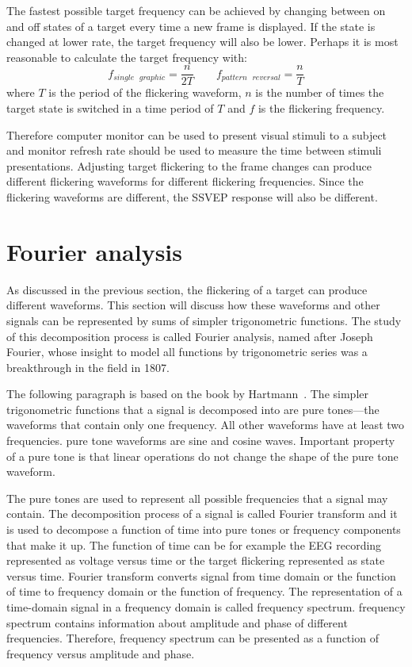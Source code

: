 The fastest possible target frequency can be achieved by changing between on and off \glspl{state} of a target every time a new \gls{frame} is displayed. If the \gls{state} is changed at lower rate, the \gls{target} frequency will also be lower. Perhaps it is most reasonable to calculate the \gls{target} frequency with:
\begin{equation}
	f_{single\mbox{ }graphic} = \frac{n}{2T} \qquad f_{pattern\mbox{ }reversal} = \frac{n}{T}
\end{equation}
where $T$ is the period of the \gls{flickering waveform}, $n$ is the number of times the \gls{target} \gls{state} is switched in a time period of $T$ and $f$ is the \gls{flickering} frequency.

Therefore computer monitor can be used to present visual stimuli to a subject and monitor \gls{refresh rate} should be used to measure the time between stimuli presentations. Adjusting \gls{target} \gls{flickering} to the \gls{frame} changes can produce different \glspl{flickering waveform} for different \gls{flickering} frequencies. Since the \glspl{flickering waveform} are different, the \gls{SSVEP} response will also be different.

\section{Fourier analysis}
\label{sec:fourier}

As discussed in the previous section, the \gls{flickering} of a \gls{target} can produce different waveforms. This section will discuss how these waveforms and other signals can be represented by sums of simpler trigonometric functions. The study of this decomposition process is called Fourier analysis, named after Joseph Fourier, whose insight to model all functions by trigonometric series was a breakthrough in the field in 1807.

The following paragraph is based on the book by Hartmann~\cite{pure_tone}. The simpler trigonometric functions that a signal is decomposed into are \glspl{pure tone}---the waveforms that contain only one frequency. All other waveforms have at least two frequencies. \Gls{pure tone} waveforms are sine and cosine waves. Important property of a \gls{pure tone} is that linear operations do not change the shape of the \gls{pure tone} waveform.

The \glspl{pure tone} are used to represent all possible frequencies that a signal may contain. The decomposition process of a signal is called \gls{Fourier transform} and it is used to decompose a function of time into \glspl{pure tone} or \glspl{frequency component} that make it up. The function of time can be for example the \gls{EEG} recording represented as voltage versus time or the \gls{target} \gls{flickering} represented as \gls{state} versus time. \Gls{Fourier transform} converts signal from time domain or the function of time to frequency domain or the function of frequency. The representation of a time-domain signal in a frequency domain is called \gls{frequency spectrum}. \Gls{frequency spectrum} contains information about amplitude and phase of different frequencies. Therefore, \gls{frequency spectrum} can be presented as a function of frequency versus amplitude and phase.

